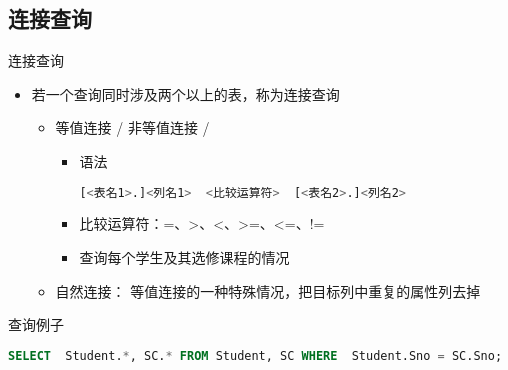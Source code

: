 \subsection{连接查询}
\begin{frame}[fragile]{连接查询}
\begin{itemize}
    \item 若一个查询同时涉及两个以上的表，称为连接查询
    \begin{itemize}
        \item 等值连接 / 非等值连接 / 
        \begin{itemize}
            \item 语法
\begin{block}{}
            \begin{lstlisting}[language=SQL]
[<表名1>.]<列名1>  <比较运算符>  [<表名2>.]<列名2>
            \end{lstlisting}
\end{block}
            
            \item 比较运算符：=、>、<、>=、<=、!=
            \item 查询每个学生及其选修课程的情况
        \end{itemize}
        \item 自然连接： 等值连接的一种特殊情况，把目标列中重复的属性列去掉
    \end{itemize}
\end{itemize}
\begin{block}{查询例子}
\begin{lstlisting}[language=SQL]
SELECT  Student.*, SC.* FROM Student, SC WHERE  Student.Sno = SC.Sno;
\end{lstlisting}
\end{block}
\end{frame}

